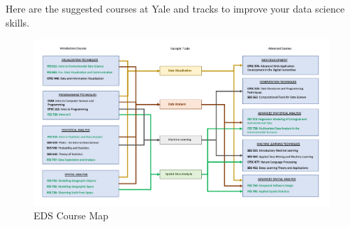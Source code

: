 \documentclass[
]{book}
\begin{document}
Here are the suggested courses at Yale and tracks to improve your data science skills.

\begin{figure}
\centering
\includegraphics{images/EDSCourseMap.png}
\caption{EDS Course Map}
\end{figure}

  
\end{document}
